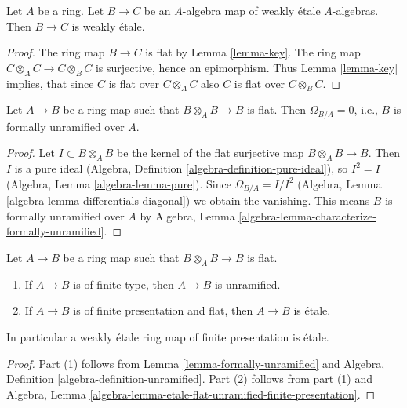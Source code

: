 \begin{lemma}
\label{lemma-weakly-etale-permanence}
Let $A$ be a ring. Let $B \to C$ be an $A$-algebra map of weakly \'etale
$A$-algebras. Then $B \to C$ is weakly \'etale.
\end{lemma}

\begin{proof}
The ring map $B \to C$ is flat by Lemma \ref{lemma-key}. The ring map
$C \otimes_A C \to C \otimes_B C$ is surjective, hence an epimorphism.
Thus Lemma \ref{lemma-key} implies, that since $C$ is flat over
$C \otimes_A C$ also $C$ is flat over $C \otimes_B C$.
\end{proof}

\begin{lemma}
\label{lemma-formally-unramified}
Let $A \to B$ be a ring map such that $B \otimes_A B \to B$ is flat.
Then $\Omega_{B/A} = 0$, i.e., $B$ is formally unramified over $A$.
\end{lemma}

\begin{proof}
Let $I \subset B \otimes_A B$ be the kernel of the flat surjective map
$B \otimes_A B \to B$. Then $I$ is a pure ideal
(Algebra, Definition \ref{algebra-definition-pure-ideal}),
so $I^2 = I$ (Algebra, Lemma \ref{algebra-lemma-pure}).
Since $\Omega_{B/A} = I/I^2$
(Algebra, Lemma \ref{algebra-lemma-differentials-diagonal})
we obtain the vanishing. This means $B$ is formally unramified over
$A$ by
Algebra, Lemma \ref{algebra-lemma-characterize-formally-unramified}.
\end{proof}

\begin{lemma}
\label{lemma-weakly-etale-finite-type}
Let $A \to B$ be a ring map such that $B \otimes_A B \to B$ is flat.
\begin{enumerate}
\item If $A \to B$ is of finite type, then $A \to B$ is unramified.
\item If $A \to B$ is of finite presentation and flat, then
$A \to B$ is \'etale.
\end{enumerate}
In particular a weakly \'etale ring map of finite presentation is \'etale.
\end{lemma}

\begin{proof}
Part (1) follows from Lemma \ref{lemma-formally-unramified} and
Algebra, Definition \ref{algebra-definition-unramified}.
Part (2) follows from part (1) and
Algebra, Lemma \ref{algebra-lemma-etale-flat-unramified-finite-presentation}.
\end{proof}

